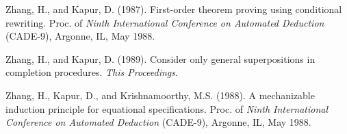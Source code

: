 \begin{thebibliography}{99}
 Zhang, H., and Kapur, D. (1987). First-order
theorem proving using conditional rewriting. 
Proc. of {\it Ninth International
Conference on Automated Deduction} (CADE-9), Argonne, IL, May 1988.

 Zhang, H., and Kapur, D. (1989). Consider
only general superpositions in completion procedures. {\it This
Proceedings}.

 Zhang, H., Kapur, D., and Krishnamoorthy,
M.S.  (1988). A mechanizable induction principle for equational
specifications.  Proc.
of {\it Ninth International Conference on Automated Deduction}
(CADE-9), Argonne, IL, May 1988.

\end{thebibliography}





